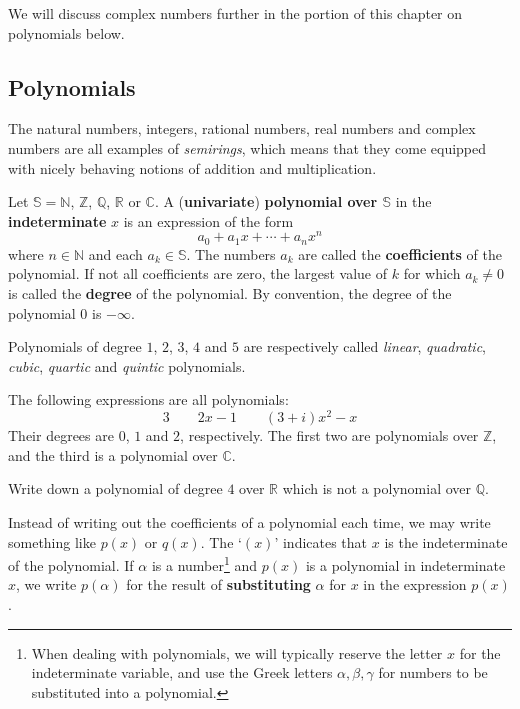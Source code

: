 We will discuss complex numbers further in the portion of this chapter on polynomials below.

\subsection*{Polynomials}
\label{pGettingStartedPolynomials}

The natural numbers, integers, rational numbers, real numbers and complex numbers are all examples of \textit{semirings}, which means that they come equipped with nicely behaving notions of addition and multiplication.

\begin{definition}
\label{defPolynomialPreliminary}
Let $\mathbb{S} = \mathbb{N}$, $\mathbb{Z}$, $\mathbb{Q}$, $\mathbb{R}$ or $\mathbb{C}$. A (\textbf{univariate}) \textbf{polynomial over $\mathbb{S}$} in the \textbf{indeterminate} $x$ is an expression of the form
\[ a_0 + a_1x + \cdots + a_nx^n \]
where $n \in \mathbb{N}$ and each $a_k \in \mathbb{S}$. The numbers $a_k$ are called the \textbf{coefficients} of the polynomial. If not all coefficients are zero, the largest value of $k$ for which $a_k \ne 0$ is called the \textbf{degree} of the polynomial. By convention, the degree of the polynomial $0$ is $-\infty$.
\end{definition}

Polynomials of degree $1$, $2$, $3$, $4$ and $5$ are respectively called \textit{linear}, \textit{quadratic}, \textit{cubic}, \textit{quartic} and \textit{quintic} polynomials.

\begin{example}
The following expressions are all polynomials:
\[ 3 \qquad 2x-1 \qquad (3+i)x^2-x \]
Their degrees are $0$, $1$ and $2$, respectively. The first two are polynomials over $\mathbb{Z}$, and the third is a polynomial over $\mathbb{C}$.
\end{example}

\begin{exercise}
Write down a polynomial of degree $4$ over $\mathbb{R}$ which is not a polynomial over $\mathbb{Q}$.
\end{exercise}

\begin{notation}
Instead of writing out the coefficients of a polynomial each time, we may write something like $p(x)$ or $q(x)$. The `$(x)$' indicates that $x$ is the indeterminate of the polynomial. If $\alpha$ is a number\footnote{When dealing with polynomials, we will typically reserve the letter $x$ for the indeterminate variable, and use the Greek letters $\alpha,\beta,\gamma$  for numbers to be substituted into a polynomial.} and $p(x)$ is a polynomial in indeterminate $x$, we write $p(\alpha)$ for the result of \textbf{substituting} $\alpha$ for $x$ in the expression $p(x)$.
\end{notation}

